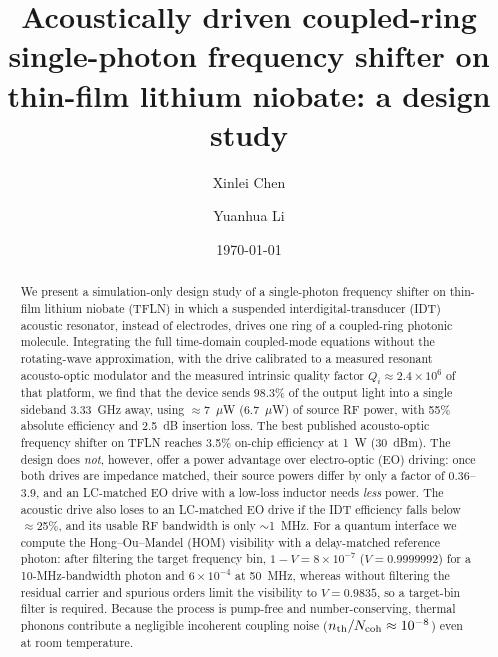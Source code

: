 \documentclass[aps,prapplied,reprint,superscriptaddress,amsmath,amssymb,floatfix]{revtex4-2}
\begin{document}
\title{Acoustically driven coupled-ring single-photon frequency shifter on thin-film lithium niobate: a design study}

\author{Xinlei Chen}
\author{Yuanhua Li}

\date{\today}

\begin{abstract}
We present a simulation-only design study of a single-photon frequency shifter on thin-film lithium niobate (TFLN) in which a suspended interdigital-transducer (IDT) acoustic resonator, instead of electrodes, drives one ring of a coupled-ring photonic molecule. Integrating the full time-domain coupled-mode equations without the rotating-wave approximation, with the drive calibrated to a measured resonant acousto-optic modulator and the measured intrinsic quality factor $Q_i\approx2.4\times10^6$ of that platform, we find that the device sends 98.3\% of the output light into a single sideband 3.33~GHz away, using $\approx$7~$\mu$W (6.7~$\mu$W) of source RF power, with 55\% absolute efficiency and 2.5~dB insertion loss. The best published acousto-optic frequency shifter on TFLN reaches 3.5\% on-chip efficiency at 1~W (30~dBm). The design does \emph{not}, however, offer a power advantage over electro-optic (EO) driving: once both drives are impedance matched, their source powers differ by only a factor of 0.36--3.9, and an LC-matched EO drive with a low-loss inductor needs \emph{less} power. The acoustic drive also loses to an LC-matched EO drive if the IDT efficiency falls below $\approx$25\%, and its usable RF bandwidth is only $\sim$1~MHz. For a quantum interface we compute the Hong--Ou--Mandel (HOM) visibility with a delay-matched reference photon: after filtering the target frequency bin, $1-V=8\times10^{-7}$ ($V=0.9999992$) for a 10-MHz-bandwidth photon and $6\times10^{-4}$ at 50~MHz, whereas without filtering the residual carrier and spurious orders limit the visibility to $V=0.9835$, so a target-bin filter is required. Because the process is pump-free and number-conserving, thermal phonons contribute a negligible incoherent coupling noise ($n_{\rm th}/N_{\rm coh}\approx10^{-8}$) even at room temperature.
\end{abstract}

\maketitle
\end{document}
